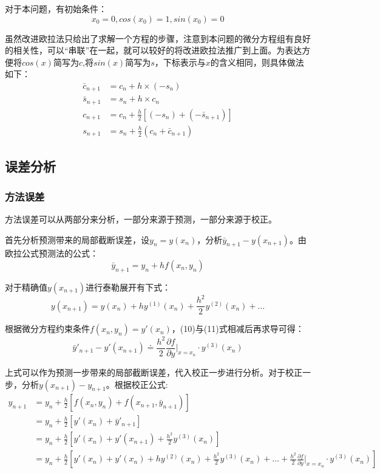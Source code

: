 \documentclass[UTF8]{ctexart}
\begin{document}
对于本问题，有初始条件：
\begin{equation}
    x_0=0,cos(x_0)=1,sin(x_0)=0
\end{equation}

虽然改进欧拉法只给出了求解一个方程的步骤，注意到本问题的微分方程组有良好的相关性，可以“串联”在一起，就可以较好的将改进欧拉法推广到上面。为表达方便将$cos(x)$简写为$c$,将$sin(x)$简写为$s$，下标表示与$x$的含义相同，则具体做法如下：
\begin{equation}
    \begin{aligned}
        \bar{c}_{n+1} &= c_n + h\times(-s_n)\\
        \bar{s}_{n+1} &= s_n + h\times c_n\\
        c_{n+1} &= c_n + \frac{h}{2}[(-s_n)+(-\bar{s}_{n+1})]\\
        s_{n+1} &= s_n + \frac{h}{2}(c_n+\bar{c}_{n+1})
    \end{aligned}
\end{equation}

\subsection{误差分析}

\subsubsection{方法误差}
方法误差可以从两部分来分析，一部分来源于预测，一部分来源于校正。

首先分析预测带来的局部截断误差，设$y_n = y(x_n)$，分析$\bar{y}_{n+1} - y(x_{n+1})$。由欧拉公式预测法的公式：
\begin{equation}
    \bar{y}_{n+1} = y_n + hf(x_n,y_n)
\end{equation}

对于精确值$y(x_{n+1})$进行泰勒展开有下式：
\begin{equation}
    y(x_{n+1}) = y(x_n) + hy^{(1)}(x_n) + \frac{h^2}{2}y^{(2)}(x_n)+\dots
\end{equation}

根据微分方程约束条件$f(x_n,y_n) = y'(x_n)$，(10)与(11)式相减后再求导可得：
\begin{equation}
    \bar{y}'_{n+1} - y'(x_{n+1}) \doteq \frac{h^2}{2}\frac{\partial f}{\partial y} \Bigg|_{x=x_n} \cdot y^{(3)}(x_n)
\end{equation}

上式可以作为预测一步带来的局部截断误差，代入校正一步进行分析。对于校正一步，分析$y(x_{n+1}) - y_{n+1}$。根据校正公式:
\begin{equation}
    \begin{aligned}
        y_{n+1} &= y_n + \frac{h}{2}[f(x_n,y_n)+f(x_{n+1},\bar{y}_{n+1})]\\
        &= y_n + \frac{h}{2}[y'(x_n)+\bar{y}'_{n+1}] \\
        &= y_n + \frac{h}{2}[y'(x_n)+y'(x_{n+1})+\frac{h^2}{2}y^{(3)}(x_n)]\\
        &= y_n + \frac{h}{2}[y'(x_n)+y'(x_n) + hy^{(2)}(x_n) + \frac{h^2}{2}y^{(3)}(x_n)+\dots + \frac{h^2}{2}\frac{\partial f}{\partial y} \Bigg|_{x=x_n} \cdot y^{(3)}(x_n)]
    \end{aligned}
\end{equation}
\end{document}
